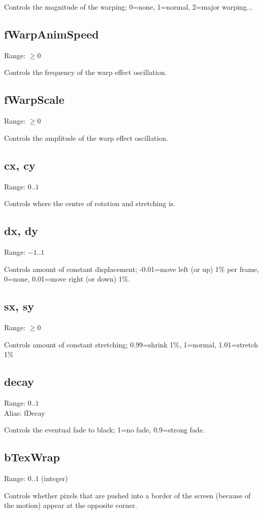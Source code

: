 \documentclass[11pt, a5paper, pagesize]{scrbook}
\begin{document}
Controls the magnitude of the warping; 0=none, 1=normal, 2=major warping...

\subsection{fWarpAnimSpeed}
Range: $\geq 0$

Controls the frequency of the warp effect oscillation.

\subsection{fWarpScale}
Range: $\geq 0$

Controls the amplitude of the warp effect oscillation.

\subsection{cx, cy}
Range: $0..1$

Controls where the centre of rotation and stretching is.

\subsection{dx, dy}
Range: $-1..1$

Controls amount of constant displacement; -0.01=move left (or up) 1\% per frame, 0=none, 0.01=move right (or down) 1\%.

\subsection{sx, sy}
Range: $\geq 0$

Controls amount of constant stretching; 0.99=shrink 1\%, 1=normal, 1.01=stretch 1\%  

\subsection{decay}
Range: $0..1$\\
Alias: fDecay

Controls the eventual fade to black; 1=no fade, 0.9=strong fade.

\subsection{bTexWrap}
Range: $0..1$ (integer)

Controls whether pixels that are pushed into a border of the screen (because of the motion) appear at the opposite corner.
\end{document}
